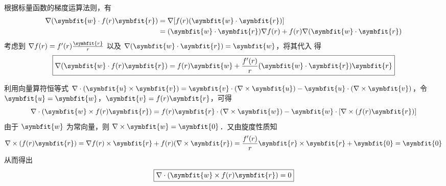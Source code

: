 \begin{solution}

    根据标量函数的梯度运算法则，有
    \begin{equation}
        \label{eq:grad-calculation}
        \begin{aligned}
            \nabla(\symbfit{w} \cdot f(r)\symbfit{r}) & = \nabla [f(r)(\symbfit{w} \cdot \symbfit{r})]                                              \\
                                                      & = (\symbfit{w} \cdot \symbfit{r}) \nabla f(r) + f(r) \nabla (\symbfit{w} \cdot \symbfit{r})
        \end{aligned}
    \end{equation}
    考虑到 $\nabla f(r) = f'(r) \frac{\symbfit{r}}{r}$ 以及 $\nabla (\symbfit{w} \cdot \symbfit{r}) = \symbfit{w}$，将其代入  得
    \begin{equation}
        \boxed{\nabla(\symbfit{w} \cdot f(r)\symbfit{r}) = f(r)\symbfit{w} + \frac{f'(r)}{r}(\symbfit{w} \cdot \symbfit{r})\symbfit{r}}
    \end{equation}


    利用向量算符恒等式 $\nabla \cdot (\symbfit{u} \times \symbfit{v}) = \symbfit{v} \cdot (\nabla \times \symbfit{u}) - \symbfit{u} \cdot (\nabla \times \symbfit{v})$，令 $\symbfit{u} = \symbfit{w}$，$\symbfit{v} = f(r)\symbfit{r}$，可得
    \begin{equation}
        \nabla \cdot (\symbfit{w} \times f(r)\symbfit{r}) = f(r)\symbfit{r} \cdot (\nabla \times \symbfit{w}) - \symbfit{w} \cdot [\nabla \times (f(r)\symbfit{r})]
    \end{equation}
    由于 $\symbfit{w}$ 为常向量，则 $\nabla \times \symbfit{w} = \symbfit{0}$．又由旋度性质知
    \begin{equation}
        \nabla \times (f(r)\symbfit{r}) = \nabla f(r) \times \symbfit{r} + f(r) (\nabla \times \symbfit{r}) = \frac{f'(r)}{r} \symbfit{r} \times \symbfit{r} + \symbfit{0} = \symbfit{0}
    \end{equation}
    从而得出
    \begin{equation}
        \boxed{\nabla \cdot (\symbfit{w} \times f(r)\symbfit{r}) = 0}
    \end{equation}



\end{solution}
